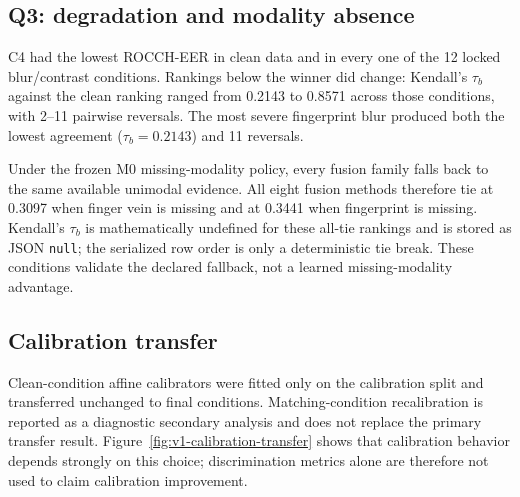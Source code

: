 


\subsection{Q3: degradation and modality absence}

C4 had the lowest ROCCH-EER in clean data and in every one of the 12 locked
blur/contrast conditions. Rankings below the winner did change: Kendall's
$\tau_b$ against the clean ranking ranged from 0.2143 to 0.8571 across those
conditions, with 2--11 pairwise reversals. The most severe fingerprint blur
produced both the lowest agreement ($\tau_b=0.2143$) and 11 reversals.

Under the frozen M0 missing-modality policy, every fusion family falls back to
the same available unimodal evidence. All eight fusion methods therefore tie at
0.3097 when finger vein is missing and at 0.3441 when fingerprint is missing.
Kendall's $\tau_b$ is mathematically undefined for these all-tie rankings and is
stored as JSON \texttt{null}; the serialized row order is only a deterministic
tie break. These conditions validate the declared fallback, not a learned
missing-modality advantage.



\subsection{Calibration transfer}

Clean-condition affine calibrators were fitted only on the calibration split
and transferred unchanged to final conditions. Matching-condition
recalibration is reported as a diagnostic secondary analysis and does not
replace the primary transfer result. Figure~\ref{fig:v1-calibration-transfer}
shows that calibration behavior depends strongly on this choice; discrimination
metrics alone are therefore not used to claim calibration improvement.


